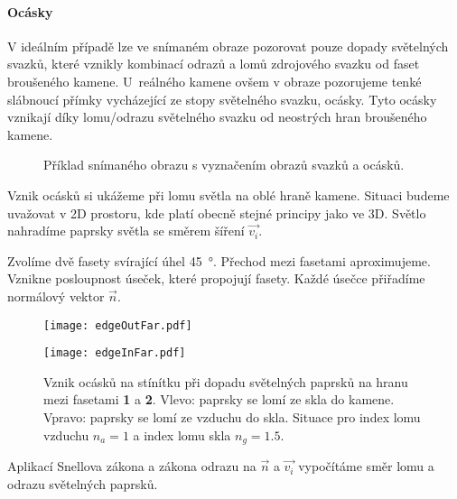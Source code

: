 \paragraph{Ocásky}
\hspace{1mm}

V ideálním případě lze ve snímaném obraze pozorovat pouze dopady světelných svazků, které vznikly kombinací odrazů a lomů zdrojového svazku od faset broušeného kamene. U~reálného kamene ovšem v obraze pozorujeme tenké slábnoucí přímky vycházející ze stopy světelného svazku, ocásky. Tyto ocásky vznikají díky lomu/odrazu světelného svazku od neostrých hran broušeného kamene.

\begin{figure}[h!]
\begin{center}
\scalebox{.9}{ }
\end{center}
\caption[Příklad snímaného obrazu s vyznačením obrazů svazků a ocásků.]{Příklad snímaného obrazu s vyznačením obrazů svazků a ocásků.}
\label{fig:tail_ex1}
\end{figure}


Vznik ocásků si ukážeme při lomu světla na oblé hraně kamene. Situaci budeme uvažovat v 2D prostoru, kde platí obecně stejné principy jako ve 3D. Světlo nahradíme paprsky světla se směrem šíření $\vec{v_i}$. 

Zvolíme dvě fasety svírající úhel \SI{45}{\degree}. Přechod mezi fasetami aproximujeme. Vznikne posloupnost úseček, které propojují fasety. Každé úsečce přiřadíme normálový vektor $\vec{n}$.  

\begin{figure}[h!]
\centering
\begin{minipage}[c]{0.43\textwidth}
\texttt{[image: edgeOutFar.pdf]}
\end{minipage}
\begin{minipage}[c]{0.53\textwidth}
\texttt{[image: edgeInFar.pdf]}
\end{minipage}

\caption[Vznik ocásků.]{Vznik ocásků na stínítku při dopadu světelných paprsků na hranu mezi fasetami \textbf{1} a \textbf{2}. Vlevo: paprsky se lomí ze skla do kamene. Vpravo: paprsky se lomí ze vzduchu do skla. Situace pro index lomu vzduchu $n_a = 1$ a index lomu skla $n_g = 1.5$.}
\label{fig:edgeIn}
\end{figure}
Aplikací Snellova zákona a zákona odrazu na $\vec{n}$ a $\vec{v_i}$ vypočítáme směr lomu a odrazu světelných paprsků.

